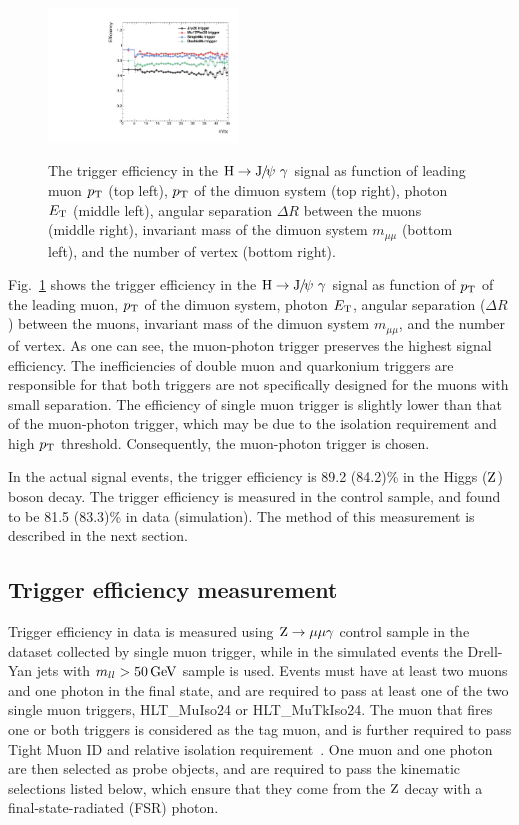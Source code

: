 \begin{figure}[p]
		    \includegraphics[width=0.45\textwidth]{Fig/Trigger/Eff_nVtx_HJpsiG_Comp}\\
		    \caption{The trigger efficiency in the $\mathrm{H}\to{\mathrm{J}\hspace{-.08em}/\hspace{-.14em}\psi}\ \gamma$ signal as function of leading muon $p_{\mathrm{T}}$ (top left), $p_{\mathrm{T}}$ of the dimuon system (top right), photon $E_{\mathrm{T}}$ (middle left), angular separation $\Delta R$ between the muons (middle right), invariant mass of the dimuon system $m_{\mu\mu}$ (bottom left), and the number of vertex (bottom right).\label{fig:Trigacceff}}
		\end{figure}
		
		Fig.~\ref{fig:Trigacceff} shows the trigger efficiency in the $\mathrm{H}\to {\mathrm{J}\hspace{-.08em}/\hspace{-.14em}\psi}\ \gamma$ signal as function of $p_{\mathrm{T}}$ of the leading muon, $p_{\mathrm{T}}$ of the dimuon system, photon $E_{\mathrm{T}}$, angular separation ($\Delta R$) between the muons, invariant mass of the dimuon system $m_{\mu\mu}$, and the number of vertex. As one can see, the muon-photon trigger preserves the highest signal efficiency. The inefficiencies of double muon and quarkonium triggers are responsible for that both triggers are not specifically designed for the muons with small separation. The efficiency of single muon trigger is slightly lower than that of the muon-photon trigger, which may be due to the isolation requirement and high $p_{\mathrm{T}}$ threshold. 
		Consequently, the muon-photon trigger is chosen.   
		
		In the actual signal events, the trigger efficiency is 89.2 (84.2)\% in the Higgs ($\mathrm{Z}$) boson decay. The trigger efficiency is measured in the control sample, and found to be 81.5 (83.3)\% in data (simulation). The method of this measurement is described in the next section. 
		
		\subsection*{Trigger efficiency measurement}
		Trigger efficiency in data is measured using $\mathrm{Z}\rightarrow\mu\mu\gamma$ control sample in the dataset collected by single muon trigger, while in the simulated events the Drell-Yan jets with $m_{ll} > 50\,\text{Ge\hspace{-.08em}V}$ sample is used. Events must have at least two muons and one photon in the final state, and are required to pass at least one of the two single muon triggers, HLT\_MuIso24 or HLT\_MuTkIso24. The muon that fires one or both triggers is considered as the tag muon, and is further required to pass Tight Muon ID and relative isolation requirement~\cite{Sirunyan:2018fpa}. One muon and one photon are then selected as probe objects, and are required to pass the kinematic selections listed below, which ensure that they come from the $\mathrm{Z}$ decay with a final-state-radiated (FSR) photon.
		
